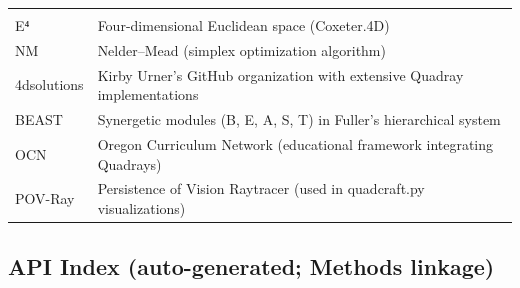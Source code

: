 \documentclass[
  10pt,
]{article}
\begin{document}
\begin{longtable}[]{@{}ll@{}}
\begin{minipage}[t]{0.47\columnwidth}
\end{minipage}\tabularnewline
\begin{minipage}[t]{0.47\columnwidth}\raggedright
E⁴\strut
\end{minipage} & \begin{minipage}[t]{0.47\columnwidth}\raggedright
Four-dimensional Euclidean space (Coxeter.4D)\strut
\end{minipage}\tabularnewline
\begin{minipage}[t]{0.47\columnwidth}\raggedright
NM\strut
\end{minipage} & \begin{minipage}[t]{0.47\columnwidth}\raggedright
Nelder--Mead (simplex optimization algorithm)\strut
\end{minipage}\tabularnewline
\begin{minipage}[t]{0.47\columnwidth}\raggedright
4dsolutions\strut
\end{minipage} & \begin{minipage}[t]{0.47\columnwidth}\raggedright
Kirby Urner's GitHub organization with extensive Quadray
implementations\strut
\end{minipage}\tabularnewline
\begin{minipage}[t]{0.47\columnwidth}\raggedright
BEAST\strut
\end{minipage} & \begin{minipage}[t]{0.47\columnwidth}\raggedright
Synergetic modules (B, E, A, S, T) in Fuller's hierarchical system\strut
\end{minipage}\tabularnewline
\begin{minipage}[t]{0.47\columnwidth}\raggedright
OCN\strut
\end{minipage} & \begin{minipage}[t]{0.47\columnwidth}\raggedright
Oregon Curriculum Network (educational framework integrating
Quadrays)\strut
\end{minipage}\tabularnewline
\begin{minipage}[t]{0.47\columnwidth}\raggedright
POV-Ray\strut
\end{minipage} & \begin{minipage}[t]{0.47\columnwidth}\raggedright
Persistence of Vision Raytracer (used in quadcraft.py
visualizations)\strut
\end{minipage}\tabularnewline
\bottomrule
\end{longtable}

\hypertarget{api-index-auto-generated-methods-linkage}{%
\subsection{API Index (auto-generated; Methods
linkage)}\label{api-index-auto-generated-methods-linkage}}
\end{document}
